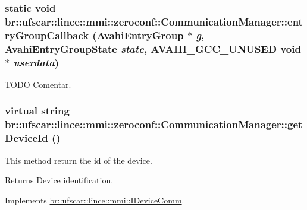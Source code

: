 \hypertarget{classbr_1_1ufscar_1_1lince_1_1mmi_1_1zeroconf_1_1CommunicationManager_a53b4fbff9b68d1c90d2b6f9da2ec7da9}{
\subsubsection[{entryGroupCallback}]{\setlength{\rightskip}{0pt plus 5cm}static void br::ufscar::lince::mmi::zeroconf::CommunicationManager::entryGroupCallback (AvahiEntryGroup $\ast$ {\em g}, \/  AvahiEntryGroupState {\em state}, \/  AVAHI\_\-GCC\_\-UNUSED void $\ast$ {\em userdata})}}
\label{classbr_1_1ufscar_1_1lince_1_1mmi_1_1zeroconf_1_1CommunicationManager_a53b4fbff9b68d1c90d2b6f9da2ec7da9}


TODO Comentar. 

\hypertarget{classbr_1_1ufscar_1_1lince_1_1mmi_1_1zeroconf_1_1CommunicationManager_ac81ba73dafe9e2ca558fad5d46f09e8c}{
\subsubsection[{getDeviceId}]{\setlength{\rightskip}{0pt plus 5cm}virtual string br::ufscar::lince::mmi::zeroconf::CommunicationManager::getDeviceId ()}}
\label{classbr_1_1ufscar_1_1lince_1_1mmi_1_1zeroconf_1_1CommunicationManager_ac81ba73dafe9e2ca558fad5d46f09e8c}


This method return the id of the device. 

\begin{DoxyReturn}{Returns}
Device identification. 
\end{DoxyReturn}


Implements \hyperlink{classbr_1_1ufscar_1_1lince_1_1mmi_1_1IDeviceComm_a4ae69c19445713ddc9fda351555c1ac2}{br::ufscar::lince::mmi::IDeviceComm}.

